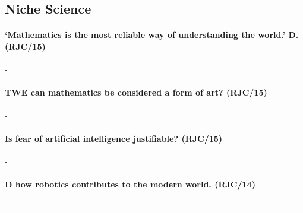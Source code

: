 \documentclass[../../main]{subfiles}
\begin{document}
\subsection{Niche Science}

\paragraph{`Mathematics is the most reliable way of understanding the world.' D. (RJC/15)}-

\paragraph{TWE can mathematics be considered a form of art? (RJC/15)}-

\paragraph{Is fear of artificial intelligence justifiable? (RJC/15)}-

\paragraph{D how robotics contributes to the modern world. (RJC/14)}-
\end{document}
